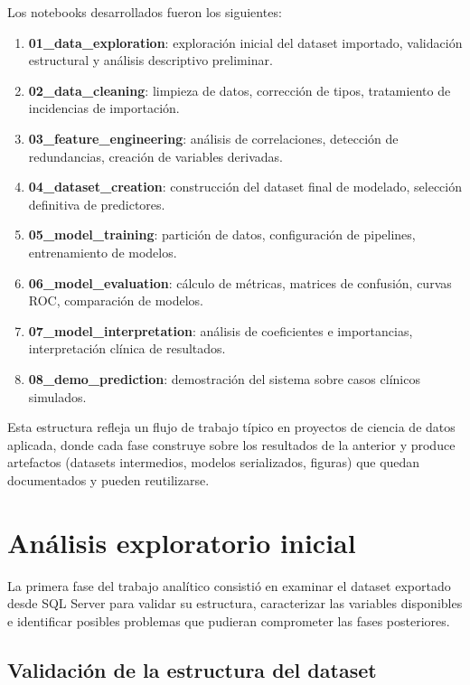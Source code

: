 \documentclass[12pt, a4paper, oneside]{report}
\begin{document}
Los notebooks desarrollados fueron los siguientes:

\begin{enumerate}
    \item \textbf{01\_data\_exploration}: exploración inicial del dataset importado, validación estructural y análisis descriptivo preliminar.
    \item \textbf{02\_data\_cleaning}: limpieza de datos, corrección de tipos, tratamiento de incidencias de importación.
    \item \textbf{03\_feature\_engineering}: análisis de correlaciones, detección de redundancias, creación de variables derivadas.
    \item \textbf{04\_dataset\_creation}: construcción del dataset final de modelado, selección definitiva de predictores.
    \item \textbf{05\_model\_training}: partición de datos, configuración de pipelines, entrenamiento de modelos.
    \item \textbf{06\_model\_evaluation}: cálculo de métricas, matrices de confusión, curvas ROC, comparación de modelos.
    \item \textbf{07\_model\_interpretation}: análisis de coeficientes e importancias, interpretación clínica de resultados.
    \item \textbf{08\_demo\_prediction}: demostración del sistema sobre casos clínicos simulados.
\end{enumerate}

Esta estructura refleja un flujo de trabajo típico en proyectos de ciencia de datos aplicada, donde cada fase construye sobre los resultados de la anterior y produce artefactos (datasets intermedios, modelos serializados, figuras) que quedan documentados y pueden reutilizarse.

\section{Análisis exploratorio inicial}

La primera fase del trabajo analítico consistió en examinar el dataset exportado desde SQL Server para validar su estructura, caracterizar las variables disponibles e identificar posibles problemas que pudieran comprometer las fases posteriores.

\subsection{Validación de la estructura del dataset}
\end{document}

